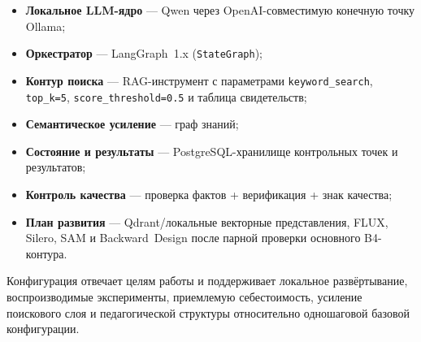 \begin{itemize}
  \item \textbf{Локальное LLM-ядро} — Qwen через OpenAI-совместимую конечную точку Ollama;
  \item \textbf{Оркестратор} — LangGraph~1.x (\texttt{StateGraph});
  \item \textbf{Контур поиска} — RAG-инструмент с параметрами
    \texttt{keyword\_search}, \texttt{top\_k=5},
    \texttt{score\_threshold=0.5} и таблица свидетельств;
  \item \textbf{Семантическое усиление} — граф знаний;
  \item \textbf{Состояние и результаты} — PostgreSQL-хранилище контрольных точек и результатов;
  \item \textbf{Контроль качества} — проверка фактов + верификация + знак качества;
  \item \textbf{План развития} — Qdrant/локальные векторные представления, FLUX, Silero,
    SAM и Backward~Design после парной проверки основного B4-контура.
\end{itemize}

Конфигурация отвечает целям работы и поддерживает локальное развёртывание,
воспроизводимые эксперименты, приемлемую себестоимость, усиление
поискового слоя и педагогической структуры относительно одношаговой
базовой конфигурации.

